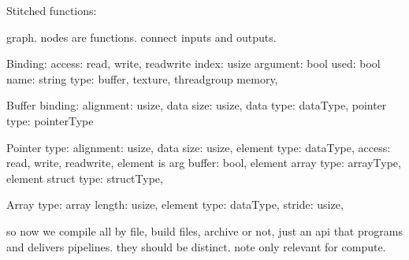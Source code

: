 Stitched functions:

graph. nodes are functions. connect inputs and outputs. 

Binding:
access: read, write, readwrite
index: usize
argument: bool
used: bool
name: string
type: buffer, texture, threadgroup memory, 

Buffer binding:
alignment: usize,
data size: usize,
data type: dataType,
pointer type: pointerType

Pointer type:
alignment: usize,
data size: usize,
element type: dataType,
access: read, write, readwrite,
element is arg buffer: bool,
element array type: arrayType,
element struct type: structType,

Array type:
array length: usize,
element type: dataType,
stride: usize,

so now we compile all by file, build files, archive or not, just an api that programs and delivers pipelines. they should be distinct. note only relevant for compute.







